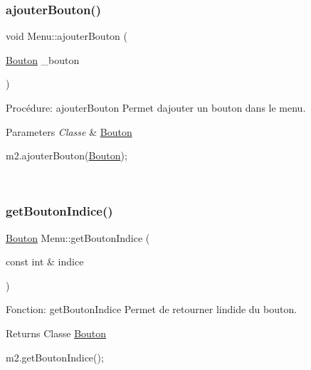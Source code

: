 \subsubsection{\texorpdfstring{ajouter\+Bouton()}{ajouterBouton()}}
{\footnotesize\ttfamily void Menu\+::ajouter\+Bouton (\begin{DoxyParamCaption}\item[{\hyperlink{classBouton}{Bouton}}]{\+\_\+bouton }\end{DoxyParamCaption})}



Procédure\+: ajouter\+Bouton Permet d\textquotesingle{}ajouter un bouton dans le menu. 


\begin{DoxyParams}{Parameters}
{\em Classe} & \hyperlink{classBouton}{Bouton} 
\begin{DoxyCode}
m2.ajouterBouton(\hyperlink{classBouton}{Bouton});
\end{DoxyCode}
 \\
\hline
\end{DoxyParams}
\mbox{\label{classMenu_a16bc4dffec20a0ce177f189f9c711e09}} 
\subsubsection{\texorpdfstring{get\+Bouton\+Indice()}{getBoutonIndice()}}
{\footnotesize\ttfamily \hyperlink{classBouton}{Bouton} Menu\+::get\+Bouton\+Indice (\begin{DoxyParamCaption}\item[{const int \&}]{indice }\end{DoxyParamCaption})}



Fonction\+: get\+Bouton\+Indice Permet de retourner l\textquotesingle{}indide du bouton. 

\begin{DoxyReturn}{Returns}
Classe \hyperlink{classBouton}{Bouton} 
\begin{DoxyCode}
m2.getBoutonIndice();
\end{DoxyCode}
 
\end{DoxyReturn}
\mbox{\label{classMenu_a6d80af8bd800d44072ddb63a80b911cd}} 
